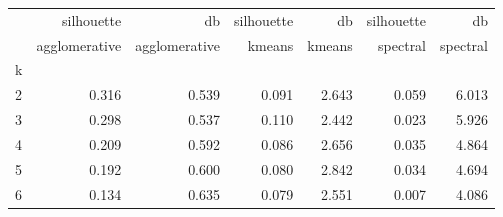 \begin{tabular}{lrrrrrr}
\toprule
{} &    silhouette &            db & silhouette &     db & silhouette &       db \\
{} & agglomerative & agglomerative &     kmeans & kmeans &   spectral & spectral \\
k &               &               &            &        &            &          \\
\midrule
2 &         0.316 &         0.539 &      0.091 &  2.643 &      0.059 &    6.013 \\
3 &         0.298 &         0.537 &      0.110 &  2.442 &      0.023 &    5.926 \\
4 &         0.209 &         0.592 &      0.086 &  2.656 &      0.035 &    4.864 \\
5 &         0.192 &         0.600 &      0.080 &  2.842 &      0.034 &    4.694 \\
6 &         0.134 &         0.635 &      0.079 &  2.551 &      0.007 &    4.086 \\
\bottomrule
\end{tabular}
